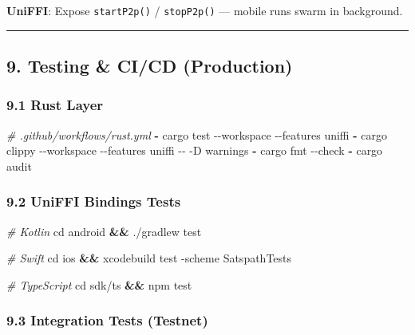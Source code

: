 \documentclass[
]{article}
\newenvironment{Shaded}{}{}
\newcommand{\AttributeTok}[1]{\textcolor[rgb]{0.49,0.56,0.16}{#1}}
\newcommand{\BuiltInTok}[1]{\textcolor[rgb]{0.00,0.50,0.00}{#1}}
\newcommand{\CommentTok}[1]{\textcolor[rgb]{0.38,0.63,0.69}{\textit{#1}}}
\newcommand{\ExtensionTok}[1]{#1}
\newcommand{\KeywordTok}[1]{\textcolor[rgb]{0.00,0.44,0.13}{\textbf{#1}}}
\newcommand{\NormalTok}[1]{#1}
\begin{document}
\textbf{UniFFI}: Expose \texttt{startP2p()} / \texttt{stopP2p()} ---
mobile runs swarm in background.

\begin{center}\rule{0.5\linewidth}{0.5pt}\end{center}

\hypertarget{testing-cicd-production}{%
\subsection{9. Testing \& CI/CD
(Production)}\label{testing-cicd-production}}

\hypertarget{rust-layer}{%
\subsubsection{9.1 Rust Layer}\label{rust-layer}}

\begin{Shaded}
\begin{Highlighting}[]
\CommentTok{\# .github/workflows/rust.yml}
\KeywordTok{{-}}\AttributeTok{ cargo test {-}{-}workspace {-}{-}features uniffi}
\KeywordTok{{-}}\AttributeTok{ cargo clippy {-}{-}workspace {-}{-}features uniffi {-}{-} {-}D warnings}
\KeywordTok{{-}}\AttributeTok{ cargo fmt {-}{-}check}
\KeywordTok{{-}}\AttributeTok{ cargo audit}
\end{Highlighting}
\end{Shaded}

\hypertarget{uniffi-bindings-tests}{%
\subsubsection{9.2 UniFFI Bindings Tests}\label{uniffi-bindings-tests}}

\begin{Shaded}
\begin{Highlighting}[]
\CommentTok{\# Kotlin}
\BuiltInTok{cd}\NormalTok{ android }\KeywordTok{\&\&} \ExtensionTok{./gradlew}\NormalTok{ test}

\CommentTok{\# Swift}
\BuiltInTok{cd}\NormalTok{ ios }\KeywordTok{\&\&} \ExtensionTok{xcodebuild}\NormalTok{ test }\AttributeTok{{-}scheme}\NormalTok{ SatspathTests}

\CommentTok{\# TypeScript}
\BuiltInTok{cd}\NormalTok{ sdk/ts }\KeywordTok{\&\&} \ExtensionTok{npm}\NormalTok{ test}
\end{Highlighting}
\end{Shaded}

\hypertarget{integration-tests-testnet}{%
\subsubsection{9.3 Integration Tests
(Testnet)}\label{integration-tests-testnet}}
\end{document}
